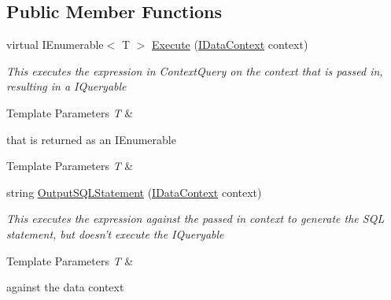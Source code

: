 \subsection*{Public Member Functions}
\begin{DoxyCompactItemize}
\item 
virtual I\-Enumerable$<$ T $>$ \hyperlink{class_highway_1_1_data_1_1_query_objects_1_1_query-g_a68dd6db173a8ea84d10d72ccc27f74f4}{Execute} (\hyperlink{interface_highway_1_1_data_1_1_interfaces_1_1_i_data_context}{I\-Data\-Context} context)
\begin{DoxyCompactList}\small\item\em This executes the expression in Context\-Query on the context that is passed in, resulting in a I\-Queryable
\begin{DoxyTemplParams}{Template Parameters}
{\em T} & \\
\hline
\end{DoxyTemplParams}
that is returned as an I\-Enumerable
\begin{DoxyTemplParams}{Template Parameters}
{\em T} & \\
\hline
\end{DoxyTemplParams}
\end{DoxyCompactList}\item 
string \hyperlink{class_highway_1_1_data_1_1_query_objects_1_1_query-g_a73d9b26cc05e595ea45e5ba03e0812ba}{Output\-S\-Q\-L\-Statement} (\hyperlink{interface_highway_1_1_data_1_1_interfaces_1_1_i_data_context}{I\-Data\-Context} context)
\begin{DoxyCompactList}\small\item\em This executes the expression against the passed in context to generate the S\-Q\-L statement, but doesn't execute the I\-Queryable
\begin{DoxyTemplParams}{Template Parameters}
{\em T} & \\
\hline
\end{DoxyTemplParams}
against the data context \end{DoxyCompactList}\end{DoxyCompactItemize}
